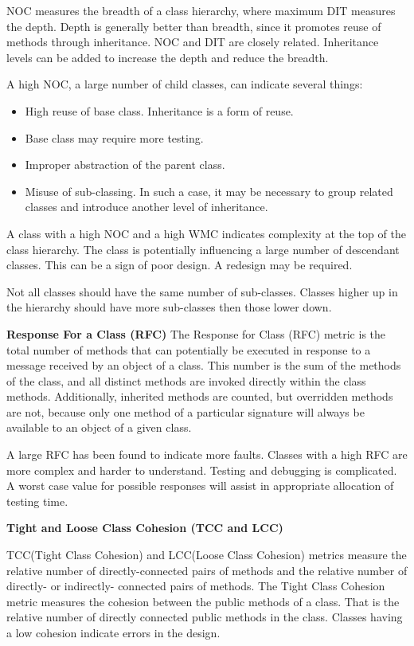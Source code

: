 NOC measures the breadth of a class hierarchy, where maximum DIT measures the depth. Depth is generally better than breadth, since it promotes reuse of methods through inheritance. NOC and DIT are closely related. Inheritance levels can be added to increase the depth and reduce the breadth.

A high NOC, a large number of child classes, can indicate several things: 
\begin{itemize}
	\item High reuse of base class. Inheritance is a form of reuse.
	\item Base class may require more testing.
	\item Improper abstraction of the parent class. 
	\item Misuse of sub-classing. In such a case, it may be necessary to group related classes and introduce another level of inheritance.
\end{itemize}

A class with a high NOC and a high WMC indicates complexity at the top of the class hierarchy. The class is potentially influencing a large number of descendant classes. This can be a sign of poor design. A redesign may be required.

Not all classes should have the same number of sub-classes. Classes higher up in the hierarchy should have more sub-classes then those lower down.

\textbf{Response For a Class (RFC)} 
The Response for Class (RFC) metric is the total number of methods that can potentially be executed in response to a message received by an object of a class. This number is the sum of the methods of the class, and all distinct methods are invoked directly within the class methods. Additionally, inherited
methods are counted, but overridden methods are not, because only one method of a particular signature will always be available to an object of a given class.

A large RFC has been found to indicate more faults. Classes with a high RFC are more complex and harder to understand. Testing and debugging is complicated. A worst case value for possible responses will assist in appropriate allocation of testing time.

\textbf{Tight and Loose Class Cohesion (TCC and LCC)}

TCC(Tight Class Cohesion) and LCC(Loose Class Cohesion) metrics measure  the  relative number of directly-connected pairs of methods and the   relative   number of directly- or indirectly- connected pairs of methods.
The Tight Class Cohesion metric measures the cohesion between the public methods of a class. That is the relative number of directly connected public methods in the class. Classes having a low cohesion indicate errors in the design.

